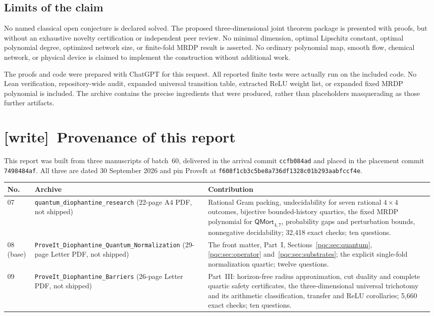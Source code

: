 \documentclass[11pt,letterpaper]{article}
\numberwithin{equation}{section}
\theoremstyle{definition}
\theoremstyle{remark}
\newcommand{\code}[1]{\nolinkurl{#1}}
\newcommand{\wtag}{\textup{[write]}}
\newcommand{\snapshot}{\texttt{f608f1cb3c5be8a736df1328c01b293aabfccf4e}}
\newcommand{\QMort}{\mathsf{QMort}}
\begin{document}
\subsection{Limits of the claim}

No named classical open conjecture is declared solved.  The proposed
three-dimensional joint theorem package is presented with proofs, but without
an exhaustive novelty certification or independent peer review.  No minimal
dimension, optimal Lipschitz constant, optimal polynomial degree, optimized
network size, or finite-fold MRDP result is asserted.  No ordinary polynomial
map, smooth flow, chemical network, or physical device is claimed to implement
the construction without additional work.

The proofs and code were prepared with ChatGPT for this request.  All reported
finite tests were actually run on the included code.  No Lean verification,
repository-wide audit, expanded universal transition table, extracted ReLU
weight list, or expanded fixed MRDP polynomial is included.  The archive
contains the precise ingredients that were produced, rather than placeholders
masquerading as those further artifacts.

\section{\wtag\ Provenance of this report}
\label{pqc:app:provenance}
This report was built from three manuscripts of batch~60, delivered in the
arrival commit \code{ccfb084ad} and placed in the placement commit
\code{7498484af}. All three are dated 30 September 2026 and pin ProveIt at
\snapshot.

\begin{center}
\small
\begin{tabularx}{\textwidth}{@{}lp{}X@{}}
\toprule
No. & Archive & Contribution\\
\midrule
07 & \code{quantum_diophantine_research} (22-page A4 PDF, not shipped) &
Rational Gram packing, undecidability for seven rational $4\times4$
outcomes, bijective bounded-history quartics, the fixed MRDP polynomial
for $\QMort_{4,7}$, probability gaps and perturbation bounds, nonnegative
decidability; 32,418 exact checks; ten questions.\\
08 (base) & \code{ProveIt_Diophantine_Quantum_Normalization} (29-page Letter
PDF, not shipped) & The front matter, Part~I, Sections~\ref{pqc:sec:quantum},
\ref{pqc:sec:operator} and~\ref{pqc:sec:substrates}; the explicit
single-fold normalization quartic; twelve questions.\\
09 & \code{ProveIt_Diophantine_Barriers} (26-page Letter PDF, not shipped) &
Part~III: horizon-free radius approximation, cut duality and complete
quartic safety certificates, the three-dimensional universal trichotomy
and its arithmetic classification, transfer and ReLU corollaries; 5,660
exact checks; ten questions.\\
\bottomrule
\end{tabularx}
\end{center}
\end{document}
